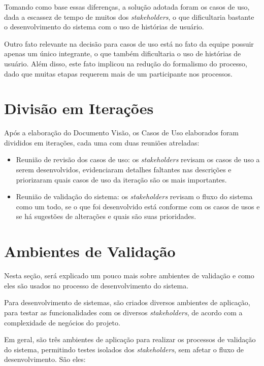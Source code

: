 Tomando como base essas diferenças, a solução adotada foram os casos de uso, dada a escassez de tempo de muitos dos \textit{stakeholders}, o que dificultaria bastante o desenvolvimento do sistema com o uso de histórias de usuário.

Outro fato relevante na decisão para casos de uso está no fato da equipe possuir apenas um único integrante, o que também dificultaria o uso de histórias de usuário. Além disso, este fato implicou na redução do formalismo do processo, dado que muitas etapas requerem mais de um participante nos processos.

\section{Divisão em Iterações}
Após a elaboração do Documento Visão, os Casos de Uso elaborados foram divididos em iterações, cada uma com duas reuniões atreladas:

\begin{itemize}
    \item Reunião de revisão dos casos de uso: os \textit{stakeholders} revisam os casos de uso a serem desenvolvidos, evidenciaram detalhes faltantes nas descrições e priorizaram quais casos de uso da iteração são os mais importantes.
    \item Reunião de validação do sistema: os \textit{stakeholders} revisam o fluxo do sistema como um todo, se o que foi desenvolvido está conforme com os casos de usos e se há sugestões de alterações e quais são suas prioridades.
\end{itemize}

\section{Ambientes de Validação}
Nesta seção, será explicado um pouco mais sobre ambientes de validação e como eles são usados no processo de desenvolvimento do sistema.

Para desenvolvimento de sistemas, são criados diversos ambientes de aplicação, para testar as funcionalidades com os diversos \textit{stakeholders}, de acordo com a complexidade de negócios do projeto.

Em geral, são três ambientes de aplicação para realizar os processos de validação do sistema, permitindo testes isolados dos \textit{stakeholders}, sem afetar o fluxo de desenvolvimento. São eles\cite{tracyragan2017}:

